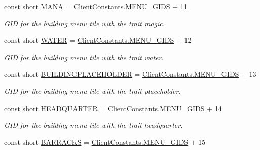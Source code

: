 \begin{DoxyCompactItemize}
const short \hyperlink{classClient_1_1Common_1_1Constants_1_1BuildingMenuGid_a336a6e66f824092f7edb0edf4bfbc1ba}{M\+A\+N\+A} = \hyperlink{classClient_1_1Common_1_1Constants_1_1ClientConstants_a4d3b0e4f36481c991c9995cb20c9347d}{Client\+Constants.\+M\+E\+N\+U\+\_\+\+G\+I\+D\+S} + 11
\begin{DoxyCompactList}\small\item\em G\+I\+D for the building menu tile with the trait magic. \end{DoxyCompactList}\item 
const short \hyperlink{classClient_1_1Common_1_1Constants_1_1BuildingMenuGid_ace1825e05572f77b2d479b6806163283}{W\+A\+T\+E\+R} = \hyperlink{classClient_1_1Common_1_1Constants_1_1ClientConstants_a4d3b0e4f36481c991c9995cb20c9347d}{Client\+Constants.\+M\+E\+N\+U\+\_\+\+G\+I\+D\+S} + 12
\begin{DoxyCompactList}\small\item\em G\+I\+D for the building menu tile with the trait water. \end{DoxyCompactList}\item 
const short \hyperlink{classClient_1_1Common_1_1Constants_1_1BuildingMenuGid_a989b0bb517d12e5fe56bf95187315926}{B\+U\+I\+L\+D\+I\+N\+G\+P\+L\+A\+C\+E\+H\+O\+L\+D\+E\+R} = \hyperlink{classClient_1_1Common_1_1Constants_1_1ClientConstants_a4d3b0e4f36481c991c9995cb20c9347d}{Client\+Constants.\+M\+E\+N\+U\+\_\+\+G\+I\+D\+S} + 13
\begin{DoxyCompactList}\small\item\em G\+I\+D for the building menu tile with the trait placeholder. \end{DoxyCompactList}\item 
const short \hyperlink{classClient_1_1Common_1_1Constants_1_1BuildingMenuGid_ad6fc0533dac9f58976f3525c3e60c30e}{H\+E\+A\+D\+Q\+U\+A\+R\+T\+E\+R} = \hyperlink{classClient_1_1Common_1_1Constants_1_1ClientConstants_a4d3b0e4f36481c991c9995cb20c9347d}{Client\+Constants.\+M\+E\+N\+U\+\_\+\+G\+I\+D\+S} + 14
\begin{DoxyCompactList}\small\item\em G\+I\+D for the building menu tile with the trait headquarter. \end{DoxyCompactList}\item 
const short \hyperlink{classClient_1_1Common_1_1Constants_1_1BuildingMenuGid_aacfe4eb9f64ded35b0a24a25fa741be4}{B\+A\+R\+R\+A\+C\+K\+S} = \hyperlink{classClient_1_1Common_1_1Constants_1_1ClientConstants_a4d3b0e4f36481c991c9995cb20c9347d}{Client\+Constants.\+M\+E\+N\+U\+\_\+\+G\+I\+D\+S} + 15

\end{DoxyCompactItemize}
